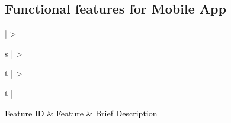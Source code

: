 \documentclass[hidelinks,a4paper]{article}
\begin{document}
	\subsection{Functional features for Mobile App}
	\begin{center}
			
	\bigskip
						
	{
	\setlength{\extrarowheight}{2pt}
					
						
	\newcolumntype{b}{X}
						
						
	\begin{tabularx}{\textwidth}{ | >{\ttfamily\raggedright\arraybackslash} s 
	  | >{\ttfamily\raggedright\arraybackslash} t 
	  | >{\ttfamily\raggedright\arraybackslash} t | }
							
	\hline
							
	{{\textcolor{black}{\large {Feature ID} \newline}}} & {{\textcolor{black}{\large Feature}}} & {\textcolor{black}{\large Brief Description}} \\
							

\end{tabularx}}
\end{center}
\end{document}
